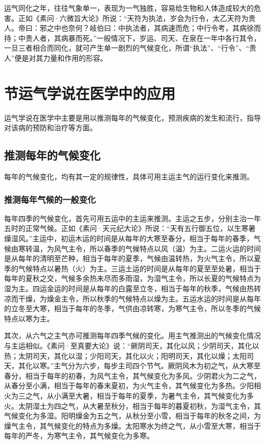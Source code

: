 \documentclass[12pt]{ctexbook}
\begin{document}
运气同化之年，往往气象单一，表现为一气独胜，容易给生物和人体造成较大的危害。正如《素问·六微旨大论》所说：“天符为执法，岁会为行令，太乙天符为贵人。帝曰：邪之中也奈何？岐伯曰：中执法者，其病速而危；中行令考，其病徐而持；中贵人者，其病暴而死。”一般情况下，岁运、司天、在泉在一年中各行其令，一旦三者相合而同化，就可产生单一剧烈的气候变化，所谓“执法”、“行令”、“贵人”便是对其力量和作用的形容。

\section{节运气学说在医学中的应用}%

运气学说在医学中主要是用以推测每年的气候变化，预测疾病的发生和流行，指导对该病的预防和治疗等方面。

\subsection{推测每年的气候变化}%

每年的气候变化，均有其一定的规律性，具体可用主运主气的运行变化来推测。

\subsubsection{推测每年气候的一般变化}%

每年四季的气候变化，首先可用五运中的主运来推测。主运之五步，分别主治一年五时的正常气候。正如《素问·天元纪大论》所说：“天有五行御五位，以生寒暑燥湿风。”主运中，初运木运的时间是从每年的大寒至春分，相当于每年的春季，气候由寒转温，为风气主令，所以春季的气候特点以风（温）为主。二运火运的时间是从每年的清明至芒种，相当于每年的夏季，气候由温转热，为火气主令，所以夏季的气候特点以暑热（火）为主。三运土运的时间是从每年的夏至至处暑，相当于每年的夏秋之交，气候多余热未尽而多雨湿，为湿气主令，所以长夏的气候特点为湿为主。四运金运的时间是从每年的白露至立冬，相当于每年的秋季，气候由热转凉而干燥，为燥金主令，所以秋季的气候特点以燥为主。五运水运的时间是从每年的立冬至大寒，相当于每年的冬季，气供由凉转寒，为寒气主令，所以冬季的气候特点以寒为主。

其次，从六气之主气亦可推测每年四季气候的变化。用主气推测出的气候变化情况与主运相似。《素问·至真要大论》说：“厥阴司天，其化以风；少阴司天，其化以热；太阴司天，其化以湿；少阳司天，其化以火；阳明司天，其化以燥；太阳司天，其化以寒。”主气分为六步，每步主司四个节气。厥阴风木为初之气，从大寒至春分，相当于每年的初春，为风气主令，其气候变化为多风。少阴君火为二之气，从春分至小满，相当于每年的春末夏初，为火气主令，其气候变化为多热。少阳相火为三之气，从小满至大暑，相当于每年的夏季，为暑气主令，其气候变化为多火。太阴湿土为四之气，从大暑至秋分，相当于每年的暮夏初秋，为湿气主令，其气候变化为多湿。阳明燥金为五之气，从秋分至小雪，相当于每年的秋冬之间，为燥气主令，其气候变化的特点为多燥。太阳寒水为终之气，从小雪至大寒，相当于每年的严冬，为寒气主令，其气候变化为多寒。
\end{document}
